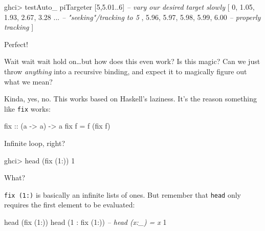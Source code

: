 \documentclass[]{article}
\newenvironment{Shaded}{}{}
\newcommand{\DecValTok}[1]{\textcolor[rgb]{0.25,0.63,0.44}{{#1}}}
\newcommand{\FloatTok}[1]{\textcolor[rgb]{0.25,0.63,0.44}{{#1}}}
\newcommand{\CommentTok}[1]{\textcolor[rgb]{0.38,0.63,0.69}{\textit{{#1}}}}
\newcommand{\OtherTok}[1]{\textcolor[rgb]{0.00,0.44,0.13}{{#1}}}
\newcommand{\FunctionTok}[1]{\textcolor[rgb]{0.02,0.16,0.49}{{#1}}}
\newcommand{\NormalTok}[1]{{#1}}
\begin{document}
\begin{Shaded}
\begin{Highlighting}[]
\NormalTok{ghci}\FunctionTok{>} \NormalTok{testAuto_ piTargeter [}\DecValTok{5}\NormalTok{,}\FloatTok{5.01}\FunctionTok{..}\DecValTok{6}\NormalTok{]      }\CommentTok{-- vary our desired target slowly}
\NormalTok{[ }\DecValTok{0}\NormalTok{, }\FloatTok{1.05}\NormalTok{, }\FloatTok{1.93}\NormalTok{, }\FloatTok{2.67}\NormalTok{, }\FloatTok{3.28} \FunctionTok{...}         \CommentTok{-- "seeking"/tracking to 5}
\NormalTok{, }\FloatTok{5.96}\NormalTok{, }\FloatTok{5.97}\NormalTok{, }\FloatTok{5.98}\NormalTok{, }\FloatTok{5.99}\NormalTok{, }\FloatTok{6.00}          \CommentTok{-- properly tracking}
\NormalTok{]}
\end{Highlighting}
\end{Shaded}

Perfect!

Wait wait wait hold on\ldots{}but how does this even work? Is this
magic? Can we just throw \emph{anything} into a recursive binding, and
expect it to magically figure out what we mean?

Kinda, yes, no. This works based on Haskell's laziness. It's the reason
something like \texttt{fix} works:

\begin{Shaded}
\begin{Highlighting}[]
\OtherTok{fix ::} \NormalTok{(a }\OtherTok{->} \NormalTok{a) }\OtherTok{->} \NormalTok{a}
\NormalTok{fix f }\FunctionTok{=} \NormalTok{f (fix f)}
\end{Highlighting}
\end{Shaded}

Infinite loop, right?

\begin{Shaded}
\begin{Highlighting}[]
\NormalTok{ghci}\FunctionTok{>} \NormalTok{head (fix (}\DecValTok{1}\FunctionTok{:}\NormalTok{))}
\DecValTok{1}
\end{Highlighting}
\end{Shaded}

What?

\texttt{fix\ (1:)} is basically an infinite lists of ones. But remember
that \texttt{head} only requires the first element to be evaluated:

\begin{Shaded}
\begin{Highlighting}[]
\NormalTok{head (fix (}\DecValTok{1}\FunctionTok{:}\NormalTok{))}
\NormalTok{head (}\DecValTok{1} \FunctionTok{:} \NormalTok{fix (}\DecValTok{1}\FunctionTok{:}\NormalTok{))     }\CommentTok{-- head (x:_) = x}
\DecValTok{1}
\end{Highlighting}
\end{Shaded}
\end{document}
